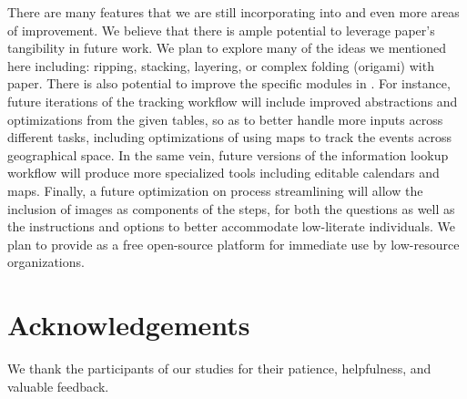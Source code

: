 \documentclass{sig-alternate}
\begin{document}
There are many features that we are still incorporating into \nifty and even more areas of improvement. We believe that there is ample potential to leverage paper's tangibility in future work. We plan to explore many of the ideas we mentioned here including: ripping, stacking, layering, or complex folding (origami) with paper. There is also potential to improve the specific modules in \nifty. For instance, future iterations of the tracking workflow will include improved abstractions and optimizations from the given tables, so as to better handle more inputs across different tasks, including optimizations of using maps to track the events across geographical space. In the same vein, future versions of the information lookup workflow will produce more specialized tools including editable calendars and maps. Finally, a future optimization on process streamlining will allow the inclusion of images as components of the steps, for both the questions as well as the instructions and options to better accommodate low-literate individuals. We plan to provide \nifty as a free open-source platform for immediate use by low-resource organizations.


\section{Acknowledgements}
We thank the participants of our studies for their patience, helpfulness, and valuable feedback.



\end{document}

